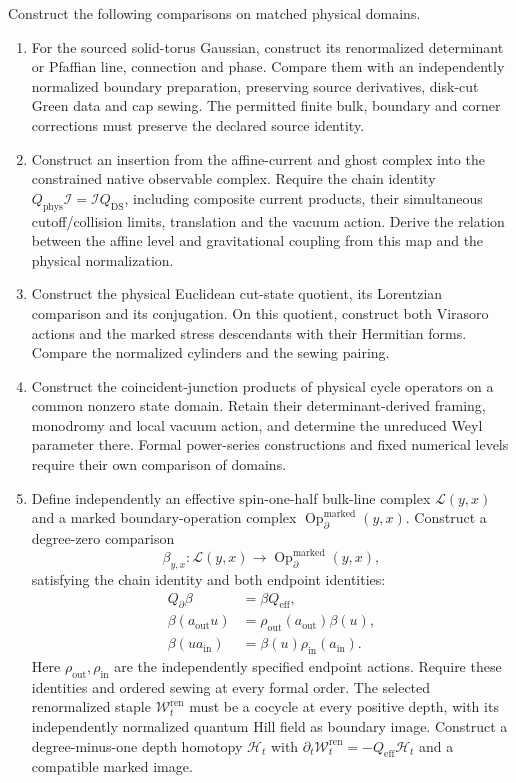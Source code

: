 \begin{problem}\label{mht:prob:gravity-native-maps}
Construct the following comparisons on matched physical domains.
\begin{enumerate}
\item For the sourced solid-torus Gaussian, construct its
renormalized determinant or Pfaffian line, connection and phase.
Compare them with an independently normalized boundary preparation,
preserving source derivatives, disk-cut Green data and cap sewing.
The permitted finite bulk, boundary and corner corrections must
preserve the declared source identity.

\item Construct an insertion from the affine-current and ghost
complex into the constrained native observable complex.
Require the chain identity
$Q_{\mathrm{phys}}\mathcal I=\mathcal I Q_{\mathrm{DS}}$,
including composite current products, their simultaneous
cutoff/collision limits, translation and the vacuum action.
Derive the relation between the affine level and gravitational
coupling from this map and the physical normalization.

\item Construct the physical Euclidean cut-state quotient,
its Lorentzian comparison and its conjugation.
On this quotient, construct both Virasoro actions and the
marked stress descendants with their Hermitian forms.
Compare the normalized cylinders and the sewing pairing.

\item Construct the coincident-junction products of physical
cycle operators on a common nonzero state domain.
Retain their determinant-derived framing, monodromy and local
vacuum action, and determine the unreduced Weyl parameter there.
Formal power-series constructions and fixed numerical levels
require their own comparison of domains.

\item Define independently an effective spin-one-half bulk-line
complex $\mathscr L(y,x)$ and a marked boundary-operation complex
$\operatorname{Op}^{\mathrm{marked}}_\partial(y,x)$.
Construct a degree-zero comparison
\[
 \beta_{y,x}:\mathscr L(y,x)\longrightarrow
 \operatorname{Op}^{\mathrm{marked}}_\partial(y,x),
\]
satisfying the chain identity and both endpoint identities:
\[
 \begin{aligned}
 Q_\partial\beta&=\beta Q_{\mathrm{eff}},\\
 \beta(a_{\mathrm{out}}u)
       &=\rho_{\mathrm{out}}(a_{\mathrm{out}})\beta(u),\\
 \beta(u a_{\mathrm{in}})
       &=\beta(u)\rho_{\mathrm{in}}(a_{\mathrm{in}}).
 \end{aligned}
\]
Here $\rho_{\mathrm{out}},\rho_{\mathrm{in}}$ are the independently
specified endpoint actions.
Require these identities and ordered sewing at every formal order.
The selected renormalized staple $\mathcal W_t^{\mathrm{ren}}$
must be a cocycle at every
positive depth, with its independently normalized quantum Hill
field as boundary image.
Construct a degree-minus-one depth homotopy $\mathcal H_t$ with
$\partial_t\mathcal W_t^{\mathrm{ren}}
=-Q_{\mathrm{eff}}\mathcal H_t$ and a compatible marked image.


\end{enumerate}
\end{problem}
